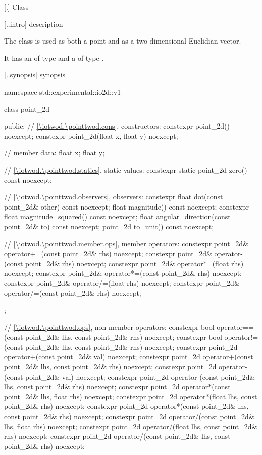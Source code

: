  [\iotwod.\pointtwod] {Class }

 [\iotwod.\pointtwod.intro] { description}

%
\pnum
The class  is used as both a point and as a two-dimensional Euclidian vector.

\pnum
It has an  of type  and a  of type .

 [\iotwod.\pointtwod.synopsis] { synopsis}

\begin{codeblock}
namespace std::experimental::io2d::v1 {
  class point_2d {
  public:
    // \ref{\iotwod.\pointtwod.cons}, constructors:
    constexpr point_2d() noexcept;
    constexpr point_2d(float x, float y) noexcept;

    // member data:
    float x;
    float y;
    
    // \ref{\iotwod.\pointtwod.statics}, static values:
    constexpr static point_2d zero() const noexcept;
    
    // \ref{\iotwod.\pointtwod.observers}, observers:
    constexpr float dot(const point_2d& other) const noexcept;
    float magnitude() const noexcept;
    constexpr float magnitude_squared() const noexcept;
    float angular_direction(const point_2d& to) const noexcept;
    point_2d to_unit() const noexcept;

    // \ref{\iotwod.\pointtwod.member.ops}, member operators:
    constexpr point_2d& operator+=(const point_2d& rhs) noexcept;
    constexpr point_2d& operator-=(const point_2d& rhs) noexcept;
    constexpr point_2d& operator*=(float rhs) noexcept;
    constexpr point_2d& operator*=(const point_2d& rhs) noexcept;
    constexpr point_2d& operator/=(float rhs) noexcept;
    constexpr point_2d& operator/=(const point_2d& rhs) noexcept;
  };
  
  // \ref{\iotwod.\pointtwod.ops}, non-member operators:
  constexpr bool operator==(const point_2d& lhs, const point_2d& rhs)
    noexcept;
  constexpr bool operator!=(const point_2d& lhs, const point_2d& rhs)
    noexcept;
  constexpr point_2d operator+(const point_2d& val) noexcept;
  constexpr point_2d operator+(const point_2d& lhs, const point_2d& rhs)
    noexcept;
  constexpr point_2d operator-(const point_2d& val) noexcept;
  constexpr point_2d operator-(const point_2d& lhs, const point_2d& rhs)
    noexcept;
  constexpr point_2d operator*(const point_2d& lhs, float rhs) noexcept;
  constexpr point_2d operator*(float lhs, const point_2d& rhs) noexcept;
  constexpr point_2d operator*(const point_2d& lhs, const point_2d& rhs)
    noexcept;
  constexpr point_2d operator/(const point_2d& lhs, float rhs) noexcept;
  constexpr point_2d operator/(float lhs, const point_2d& rhs) noexcept;
  constexpr point_2d operator/(const point_2d& lhs, const point_2d& rhs)
    noexcept;
}
\end{codeblock}

